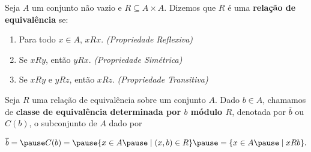 \documentclass{beamer}
\begin{document}
    \begin{frame}
        \begin{definicao}
            Seja $A$ um conjunto n{\~a}o vazio \pause e $R\subseteq A \times A$. \pause Dizemos que $R$ {\'e} uma \textbf{rela{\c c}{\~a}o de equival{\^e}ncia} se:\pause
            \begin{enumerate}[label={\roman*})]
                \item Para todo $x \in A$, $xRx$. \textit{(Propriedade Reflexiva)}\pause\vspace{.2cm}

                \item Se $xRy$, ent\~ao $yRx$. \textit{(Propriedade Sim\'etrica)}\pause\vspace{.2cm}

                \item Se $xRy$ e $yRz$, ent\~ao $xRz$. \textit{(Propriedade Transitiva)}
            \end{enumerate}
        \end{definicao}
    \end{frame}

    \begin{frame}
        \begin{definicao}
            Seja $R$ uma rela{\c c}{\~a}o de equival{\^e}ncia sobre um conjunto $A$. \pause Dado $b \in A$, \pause chamamos de \textbf{classe de equival{\^e}ncia \pause determinada por $b$ \pause m{\'o}dulo $R$}\pause, denotada por $\overline{b}$ \pause ou $C(b)$, \pause o subconjunto de $A$ \pause dado por\pause
            \begin{center}
                $\overline{b} =\pause C(b) = \pause \{x \in A \pause \mid (x,b) \in R\}\pause = \{x \in A \pause\mid xRb\}.$
            \end{center}
        \end{definicao}
    \end{frame}
\end{document}
